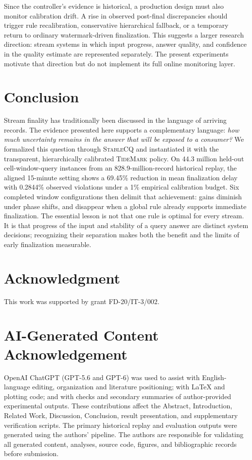\documentclass[conference]{IEEEtran}
\newcommand{\stablecq}{\textsc{StableCQ}}
\newcommand{\tidemark}{\textsc{TideMark}}
\begin{document}
Since the controller's evidence is historical, a production design must also monitor calibration drift. A rise in observed post-final discrepancies should trigger rule recalibration, conservative hierarchical fallback, or a temporary return to ordinary watermark-driven finalization. This suggests a larger research direction: stream systems in which input progress, answer quality, and confidence in the quality estimate are represented separately. The present experiments motivate that direction but do not implement its full online monitoring layer.

\section{Conclusion}
Stream finality has traditionally been discussed in the language of arriving records. The evidence presented here supports a complementary language: \emph{how much uncertainty remains in the answer that will be exposed to a consumer?} We formalized this question through \stablecq{} and instantiated it with the transparent, hierarchically calibrated \tidemark{} policy. On 44.3 million held-out cell-window-query instances from an 828.9-million-record historical replay, the aligned 15-minute setting shows a 69.45\% reduction in mean finalization delay with 0.2844\% observed violations under a 1\% empirical calibration budget. Six completed window configurations then delimit that achievement: gains diminish under phase shifts, and disappear when a global rule already supports immediate finalization. The essential lesson is not that one rule is optimal for every stream. It is that progress of the input and stability of a query answer are distinct system decisions; recognizing their separation makes both the benefit and the limits of early finalization measurable.


\section*{Acknowledgment}
This work was supported by grant FD-20/IT-3/002.

\section*{AI-Generated Content Acknowledgement}
OpenAI ChatGPT (GPT-5.6 and GPT-6) was used to assist with English-language editing, organization and literature positioning; with LaTeX and plotting code; and with checks and secondary summaries of author-provided experimental outputs. These contributions affect the Abstract, Introduction, Related Work, Discussion, Conclusion, result presentation, and supplementary verification scripts. The primary historical replay and evaluation outputs were generated using the authors' pipeline. The authors are responsible for validating all generated content, analyses, source code, figures, and bibliographic records before submission.
\end{document}
